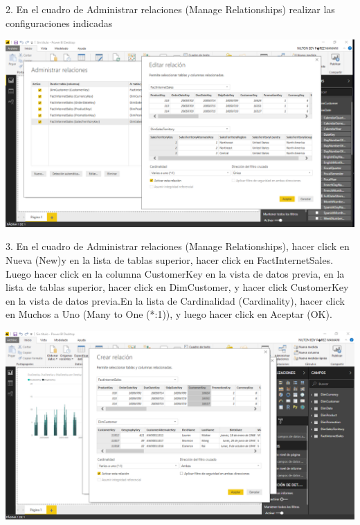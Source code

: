 \begin{itemize}
2. En el cuadro de Administrar relaciones (Manage Relationships) realizar las configuraciones indicadas 
\end{itemize} 

\begin{center}
\includegraphics[width=15cm]{./Imagenes/img2} 
\end{center}

\begin{itemize}
3. En el cuadro de Administrar relaciones (Manage Relationships), hacer click en Nueva (New)y en la lista de tablas superior, hacer click en FactInternetSales. Luego hacer click en la columna
CustomerKey en la vista de datos previa, en la lista de tablas superior, hacer click en DimCustomer, y hacer click CustomerKey en la vista de datos previa.En la lista de Cardinalidad (Cardinality), hacer click en Muchos a Uno (Many to One (*:1)), y luego hacer
click en Aceptar (OK).

\end{itemize} 

\begin{center}
\includegraphics[width=15cm]{./Imagenes/img3} 
\end{center}

